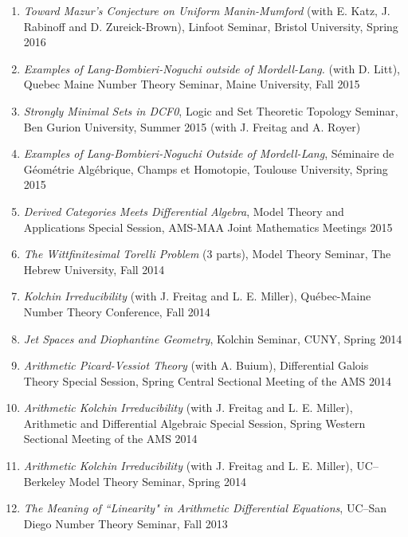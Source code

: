 \documentclass[a4paper,10pt]{article}
\begin{document}
\begin{enumerate}
	\item \emph{Toward Mazur's Conjecture on Uniform Manin-Mumford} (with E. Katz, J. Rabinoff and D. Zureick-Brown), Linfoot Seminar, Bristol University, Spring 2016
	\item \emph{Examples of Lang-Bombieri-Noguchi outside of Mordell-Lang.} (with D. Litt),  Quebec Maine Number Theory Seminar, Maine University, Fall 2015
	\item \emph{Strongly Minimal Sets in DCF0},  Logic and Set Theoretic Topology Seminar, Ben Gurion University, Summer 2015 (with J. Freitag and A. Royer)
	\item \emph{Examples of Lang-Bombieri-Noguchi Outside of Mordell-Lang}, S\'eminaire de G\'eom\'etrie Alg\'ebrique, Champs et Homotopie, Toulouse University, Spring 2015
	\item \emph{Derived Categories Meets Differential Algebra}, Model Theory and Applications Special Session, AMS-MAA Joint Mathematics Meetings 2015
	\item \emph{The Wittfinitesimal Torelli Problem} (3 parts), Model Theory Seminar, The Hebrew University, Fall 2014
	\item \emph{Kolchin Irreducibility} (with J. Freitag and L. E. Miller),
	Qu\'{e}bec-Maine Number Theory Conference, Fall 2014
	\item \emph{Jet Spaces and Diophantine Geometry},
	Kolchin Seminar, CUNY, Spring 2014
	\item \emph{Arithmetic Picard-Vessiot Theory} (with A. Buium),
	Differential Galois Theory Special Session, Spring Central Sectional Meeting of the AMS 2014
	\item \emph{Arithmetic Kolchin Irreducibility} (with J. Freitag and L. E. Miller), 
	Arithmetic and Differential Algebraic Special Session, Spring Western Sectional Meeting of the AMS 2014
	\item \emph{Arithmetic Kolchin Irreducibility} (with J. Freitag and L. E. Miller), UC--Berkeley Model Theory Seminar, Spring 2014
	\item \emph{The Meaning of ``Linearity" in Arithmetic Differential Equations}, UC--San Diego Number Theory Seminar, Fall 2013

\end{enumerate}
\end{document}
